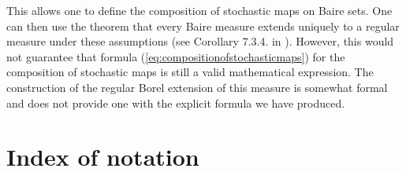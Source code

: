 \documentclass[12pt]{article}
\theoremstyle{theorem}
\theoremstyle{definition}
\numberwithin{equation}{section}
\newcommand{\<}{\langle}
\renewcommand{\>}{\rangle}
\begin{document}
This allows one to define the composition
of stochastic maps on Baire sets. One can then use the theorem that
every Baire measure extends uniquely to a regular measure 
under these assumptions (see Corollary 7.3.4. in \cite{Bo07ii}).
However, this would not guarantee that formula 
(\ref{eq:compositionofstochasticmaps}) for the composition of stochastic 
maps is still a valid mathematical expression. The construction
of the regular Borel extension of this measure is somewhat formal
and does not provide one with the explicit formula we have produced. 



\pagebreak
\section*{Index of notation}
\label{indexofnotation}
\end{document}
